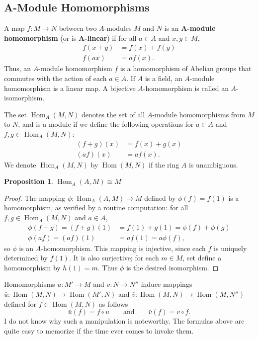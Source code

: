 \documentclass[11pt]{article}
\newtheorem{proposition}{Proposition}
\newcommand{\Hom}{\operatorname{Hom}}
\begin{document}

\subsection{A-Module Homomorphisms}

A map $f: M \to N$ between two $A$-modules $M$ and $N$ is an \textbf{A-module homomorphism} (or is \textbf{A-linear}) if for all $a \in A$ and $x, y \in M$,
\begin{align*}
	f(x + y) & = f(x) + f(y) \\
	f(ax)    & = a f(x).
\end{align*}
Thus, an $A$-module homomorphism $f$ is a homomorphism of Abelian groups that commutes with the action of each $a \in A$. If $A$ is a field, an $A$-module homomorphism is a linear map. A bijective $A$-homomorphism is called an $A$-isomorphism.

The set $\Hom_{A}(M, N)$ denotes the set of all $A$-module homomorphisms from $M$ to $N$, and is a module if we define the following operations for $a \in A$ and $f, g \in \Hom_{A}(M, N)$:
  \begin{align*}
	(f + g)(x) & = f(x) + g(x) \\
	(af)(x)    & = a f(x).
\end{align*}
We denote $\Hom_{A}(M, N)$ by $\Hom(M, N)$ if the ring $A$ is unambiguous.

\begin{adjustwidth}{0.5cm}{}
	\begin{proposition}
		$\Hom_{A}(A, M) \cong M$
	\end{proposition}
	\begin{proof}
		The mapping $\phi : \Hom_{A}(A, M) \to M$ defined by $\phi(f) = f(1)$ is a homomorphism, as verified by a routine computation: for all $f, g \in \Hom_{A}(M, N)$ and $a \in A$,
		\begin{align*}
      \phi(f + g) = (f + g)(1) &= f(1) + g(1) = \phi(f) + \phi(g) \\
            \phi(af) = (af)(1) &= a f(1) = a \phi(f),
		\end{align*}
		so $\phi$ is an $A$-homomorphism. This mapping is injective, since each $f$ is uniquely determined by $f(1)$. It is also surjective; for each $m \in M$, set define a homomorphism by $h(1) = m$. Thus $\phi$ is the desired isomorphism.
	\end{proof}
\end{adjustwidth}

Homomorphisms $u : M' \to M$ and $v : N \to N''$ induce mappings $\bar{u} : \Hom(M, N) \to \Hom(M', N)$ and $\bar{v} : \Hom(M, N) \to \Hom(M, N'')$ defined for $f \in \Hom(M, N)$ as follows
\[
	\bar{u}(f) = f \circ u \qquad \text{and} \qquad \bar{v}(f) = v \circ f.
\]
I do not know why such a manipulation is noteworthy. The formulas above are quite easy to memorize if the time ever comes to invoke them.
\end{document}

